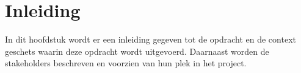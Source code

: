 \chapter{Inleiding}
In dit hoofdstuk wordt er een inleiding gegeven tot de opdracht en de context geschets waarin deze opdracht wordt uitgevoerd.
Daarnaast worden de stakeholders beschreven en voorzien van hun plek in het project.





